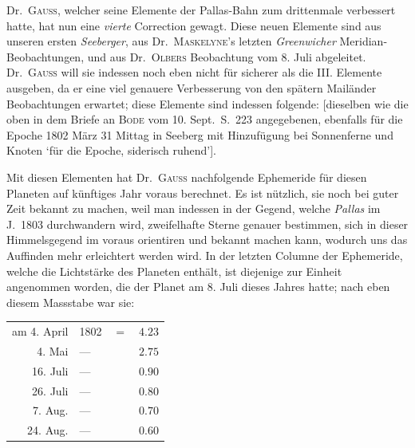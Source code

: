 Dr.\ \textsc{Gauss}, welcher seine Elemente der Pallas-Bahn zum drittenmale verbessert hatte, hat nun eine \textit{vierte} Correction gewagt. Diese neuen Elemente sind aus unseren ersten \textit{Seeberger}, aus Dr.\ \textsc{Maskelyne}'s letzten \textit{Greenwicher} Meridian-Beobachtungen, und aus Dr.\ \textsc{Olbers} Beobachtung vom 8. Juli abgeleitet. Dr.\ \textsc{Gauss} will sie indessen noch eben nicht für sicherer als die III. Elemente ausgeben, da er eine viel genauere Verbesserung von den spätern Mailänder Beobachtungen erwartet; diese Elemente sind indessen folgende: [dieselben wie die oben in dem Briefe an \textsc{Bode} vom 10. Sept.\ S.\ 223 angegebenen, ebenfalls für die Epoche 1802 März 31 Mittag in Seeberg mit Hinzufügung bei Sonnenferne und Knoten ‘für die Epoche, siderisch ruhend’].

Mit diesen Elementen hat Dr.\ \textsc{Gauss} nachfolgende Ephemeride für diesen Planeten auf künftiges Jahr voraus berechnet. Es ist nützlich, sie noch bei guter Zeit bekannt zu machen, weil man indessen in der Gegend, welche \textit{Pallas} im J.\ 1803 durchwandern wird, zweifelhafte Sterne genauer bestimmen, sich in dieser Himmelsgegend im voraus orientiren und bekannt machen kann, wodurch uns das Auffinden mehr erleichtert werden wird. In der letzten Columne der Ephemeride, welche die Lichtstärke des Planeten enthält, ist diejenige zur Einheit angenommen worden, die der Planet am 8. Juli dieses Jahres hatte; nach eben diesem Massstabe war sie:
\begin{center}
\begin{tabular}{r l l r}
am 4. April&1802&$=$&$4.23$\\
4. Mai&—&&$2.75$\\
16. Juli&—&&$0.90$\\
26. Juli&—&&$0.80$\\
7. Aug.&—&&$0.70$\\
24. Aug.&—&&$0.60$
\end{tabular}
\end{center}
